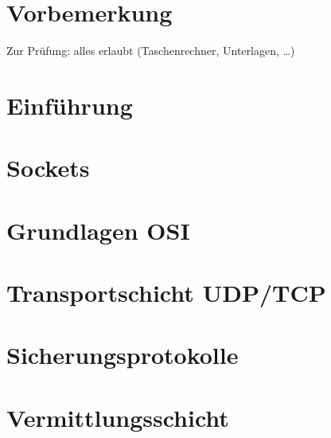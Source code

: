 \newcommand{\customDir}{../}








%
\setlength{\headheight}{10mm}	%



\maketitle
\newpage
\tableofcontents
\newpage

\chapter*{Vorbemerkung}

Zur Prüfung: alles erlaubt (Taschenrechner, Unterlagen, …)

\chapter{Einführung}
%

\chapter{Sockets}
%

\chapter{Grundlagen OSI}
%

\chapter{Transportschicht UDP/TCP}
%

\chapter{Sicherungsprotokolle}
%

\chapter{Vermittlungsschicht}



